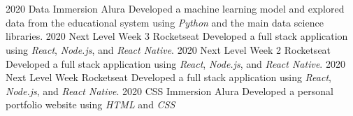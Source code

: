 \documentclass{cv}
\begin{document}
    \section*{}
        \begin{entrylist}
            \entry
                {2020}
                {Data Immersion}
                {Alura}
                {Developed a machine learning model and explored data from the educational system using \textit{Python} and the main data science libraries.}
            \entry
                {2020}
                {Next Level Week 3}
                {Rocketseat}
                {Developed a full stack application using \textit{React}, \textit{Node.js}, and \textit{React Native}.}
            \entry
                {2020}
                {Next Level Week 2}
                {Rocketseat}
                {Developed a full stack application using \textit{React}, \textit{Node.js}, and \textit{React Native}.}
            \entry
                {2020}
                {Next Level Week}
                {Rocketseat}
                {Developed a full stack application using \textit{React}, \textit{Node.js}, and \textit{React Native}.}
            \entry
                {2020}
                {CSS Immersion}
                {Alura}
                {Developed a personal portfolio website using \textit{HTML} and \textit{CSS}}
        \end{entrylist}
\end{document}
